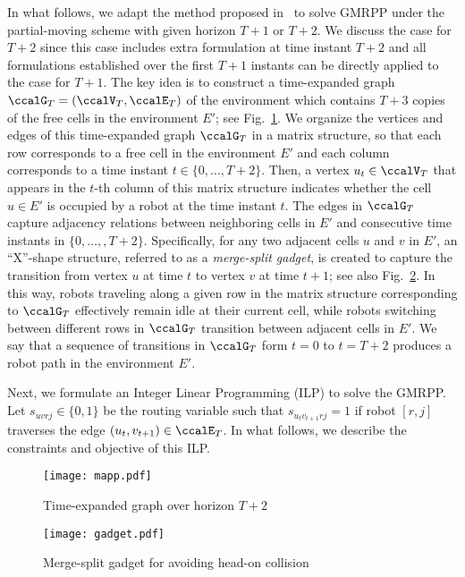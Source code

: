 \documentclass[Afour,sageh,times]{sagej}
\begin{document}
{{  In what follows, we adapt the method proposed in~\cite{yu2016optimal} to solve GMRPP under the partial-moving scheme with given horizon $T+1$ or $T+2$. We discuss the case for $T+2$ since this case includes extra formulation at time instant $T+2$ and all formulations established over the first $T+1$ instants can be directly applied to the case for $T+1$.
  The key idea is to construct a time-expanded graph $\ccalG_T = (\ccalV_T, \ccalE_T)$ of the environment which contains $T+3$ copies of the free cells in the environment $E'$; see Fig.~\ref{fig:mapp}. We organize the vertices and edges of this time-expanded graph $\ccalG_T$ in a matrix structure, so that each row corresponds to a free cell in the environment $E'$ and each column corresponds to a time instant $t\in \{0,\ldots,T+2\}$. Then, a vertex $u_t \in \ccalV_T$ that appears in the $t$-th column of this matrix structure indicates whether the cell $u\in E'$ is occupied by a robot at the time instant $t$. The edges in $\ccalG_T$ capture  adjacency relations between neighboring cells in $E'$ and consecutive time instants in $\{0,\ldots,,T+2\}$. Specifically, for any two adjacent cells $u$ and $v$ in $E'$, an ``X''-shape structure, referred to as a {\it merge-split gadget}, is created to capture the transition from vertex $u$ at time $t$ to vertex $v$ at time $t+1$; see also Fig.~\ref{fig:gadget}. In this way, robots traveling along a given row in the matrix structure corresponding to $\ccalG_T$ effectively remain idle at their current cell, while robots switching between different rows in $\ccalG_T$ transition between adjacent cells in $E'$. We say that a sequence of transitions in $\ccalG_T$ form $t=0$ to $t=T+2$ produces a robot path in the environment $E'$.

Next, we formulate an Integer Linear Programming (ILP) to solve the GMRPP. Let $s_{uvrj} \in\{0,1\}$ be the routing variable such that $s_{u_{t}v_{t+1}rj} = 1$ if robot $[r,j]$ traverses the edge $(u_t,v_{t+1}) \in \ccalE_T$. In what follows, we describe the constraints and objective of this ILP.

\begin{figure}[t]
  \centering
  \texttt{[image: mapp.pdf]}
  \caption{Time-expanded graph over horizon $T+2$}
  \label{fig:mapp}
\end{figure}

\begin{figure}[t]
  \centering
  \texttt{[image: gadget.pdf]}
  \caption{Merge-split gadget for avoiding head-on collision}
  \label{fig:gadget}
\end{figure}
}}
\end{document}
